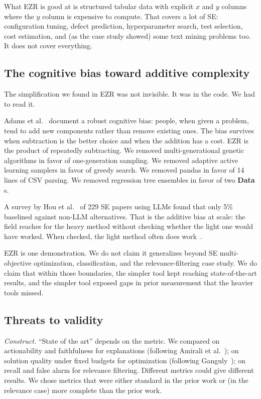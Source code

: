 \documentclass[AMA,STIX2COL]{WileyNJDv5}
\newcommand{\IT}{{\sffamily EZR}}
\newcommand{\cls}[1]{%
  \setlength{\fboxsep}{1.5pt}%
  \colorbox{clsbg}{\sffamily\bfseries{#1}}%
}
\begin{document}
What \IT{} is good at is structured tabular data with explicit
$x$ and $y$ columns where the $y$ column is expensive to
compute. That covers a lot of SE: configuration tuning, defect
prediction, hyperparameter search, test selection, cost
estimation, and (as the case study showed) some text mining
problems too. It does not cover everything.

\subsection{The cognitive bias toward additive complexity}

The simplification we found in \IT{} was not invisible. It was
in the code. We had to read it.

Adams et al.~\cite{adams2021people} document a robust cognitive
bias: people, when given a problem, tend to add new components
rather than remove existing ones. The bias survives when
subtraction is the better choice and when the addition has a
cost. \IT{} is the product of repeatedly subtracting. We removed
multi-generational genetic algorithms in favor of one-generation
sampling. We removed adaptive active learning samplers in favor
of greedy search. We removed pandas in favor of 14 lines of CSV
parsing. We removed regression tree ensembles in favor of two
\cls{Data}s.

A survey by Hou et al.~\cite{Hou24} of 229 SE papers using LLMs
found that only 5\% baselined against non-LLM alternatives.
That is the additive bias at scale: the field reaches for the
heavy method without checking whether the light one would have
worked. When checked, the light method often does
work~\cite{grinsztajn2022why,somvanshi2024survey,Tawosi23,
majumder2018500+,Ling24,Fu17,johnson2024ai}.

\IT{} is one demonstration. We do not claim it generalizes
beyond SE multi-objective optimization, classification, and the
relevance-filtering case study. We do claim that within those
boundaries, the simpler tool kept reaching state-of-the-art
results, and the simpler tool exposed gaps in prior measurement
that the heavier tools missed.

\subsection{Threats to validity}

\textit{Construct.} ``State of the art'' depends on the metric.
We compared on actionability and faithfulness for explanations
(following Amirali et al.~\cite{amirali}); on solution quality
under fixed budgets for optimization (following
Ganguly~\cite{kashin}); on recall and false alarm for relevance
filtering. Different metrics could give different results. We
chose metrics that were either standard in the prior work or
(in the relevance case) more complete than the prior work.
\end{document}
